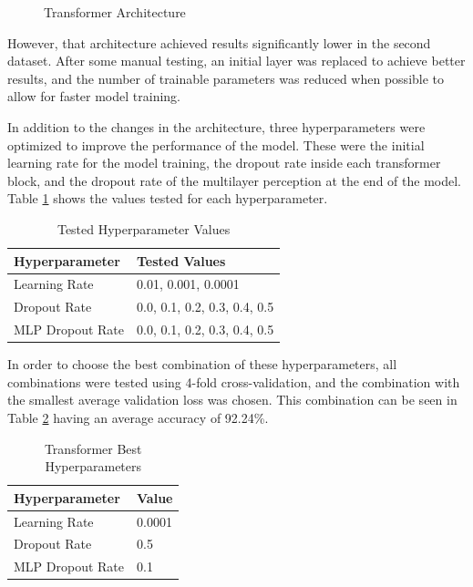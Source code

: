 \begin{figure}[H]
    \centering
    {\fontsize{10}{12}\selectfont}
    \caption[Transformer Architecture]{Transformer Architecture}
    \label{fig:transformer_architecture_dataset1}
\end{figure}

However, that architecture achieved results significantly lower in the second dataset. After some manual testing, an initial layer was replaced to achieve better results, and the number of trainable parameters was reduced when possible to allow for faster model training.

In addition to the changes in the architecture, three hyperparameters were optimized to improve the performance of the model. These were the initial learning rate for the model training, the dropout rate inside each transformer block, and the dropout rate of the multilayer perception at the end of the model. Table \ref{table:transformer_hyperparameters} shows the values tested for each hyperparameter.

\begin{table}[H]
    \centering
    \caption{Tested Hyperparameter Values}
    \label{table:transformer_hyperparameters}
    \begin{tabular}{|l|l|}
        \hline
        Hyperparameter & Tested Values \\
        \hline
        Learning Rate & 0.01, 0.001, 0.0001 \\
        \hline
        Dropout Rate & 0.0, 0.1, 0.2, 0.3, 0.4, 0.5 \\
        \hline
        MLP Dropout Rate & 0.0, 0.1, 0.2, 0.3, 0.4, 0.5 \\
        \hline
    \end{tabular}
\end{table}

In order to choose the best combination of these hyperparameters, all combinations were
tested using 4-fold cross-validation, and the combination with the smallest average validation loss was chosen. This combination can be seen in Table \ref{table:transformer_best_hyperparameters}
having an average accuracy of 92.24\%.

\begin{table}[H]
    \centering
    \caption{Transformer Best Hyperparameters}
    \label{table:transformer_best_hyperparameters}
    \begin{tabular}{|l|l|}
        \hline
        Hyperparameter & Value \\
        \hline
        Learning Rate & 0.0001 \\
        \hline
        Dropout Rate & 0.5 \\
        \hline
        MLP Dropout Rate & 0.1 \\
        \hline
    \end{tabular}
\end{table}

